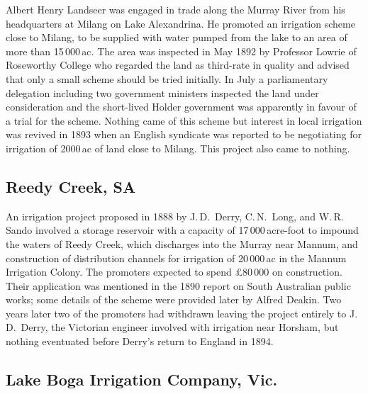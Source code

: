 Albert Henry Landseer  was engaged in trade
along the Murray River from his headquarters at Milang on Lake
Alexandrina.   He promoted an irrigation
scheme close to Milang, to be supplied with water pumped from the lake
to an area of more than 15\,000\,ac.  The area was inspected in May
1892 by Professor Lowrie  of Roseworthy College
who regarded the land as third-rate in quality and advised that only a
small scheme should be tried initially.  In July a parliamentary
delegation including two government ministers inspected the land under
consideration and the short-lived Holder government was apparently in
favour of a trial for the scheme.  Nothing came of this scheme but
interest in local irrigation was revived in 1893 when an English
syndicate was reported to be negotiating for irrigation of 2000\,ac of
land close to Milang.  This project also came to
nothing.

\subsection*{Reedy Creek, SA} 

An irrigation project proposed in 1888 by J.\,D.~Derry, C.\,N.~Long,
and W.\,R. San\-do  
 involved a storage reservoir with a capacity of
17\,000\,acre-foot to impound the waters of Reedy Creek, which
discharges into the Murray  near Mannum,
 and
construction of distribution channels for irrigation of 20\,000\,ac in
the Mannum Irrigation Colony.  The
promoters expected to spend
\pounds80\,000 on construction.  Their application was mentioned in
the 1890 report on South Australian public works; some details of the
scheme were provided later by Alfred Deakin.  Two years later two of
the promoters had withdrawn leaving the project entirely to
J.\,D.~Derry, the Victorian engineer involved with irrigation near
Horsham, but nothing eventuated before Derry's return to England in
1894.

\subsection*{Lake Boga Irrigation Company, Vic.} 

